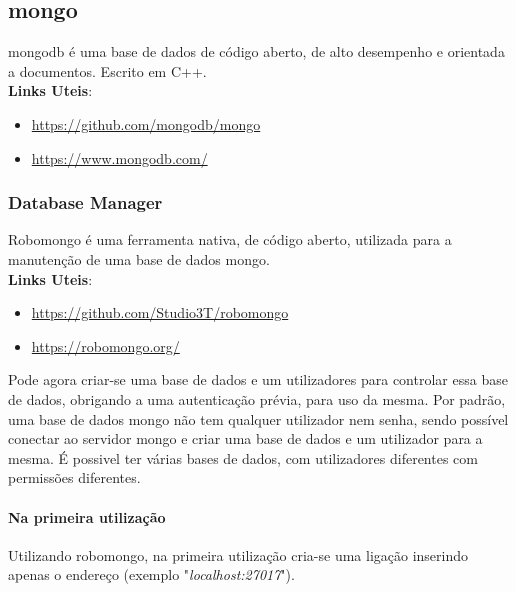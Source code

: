 \subsection{mongo}
mongodb é uma base de dados de código aberto, de alto desempenho e orientada a documentos. Escrito em C++.\newline \\
\textbf{Links Uteis}:
\begin{itemize}
\item \url{https://github.com/mongodb/mongo}
\item \url{https://www.mongodb.com/}
\end{itemize}

\subsubsection{Database Manager}
Robomongo é uma ferramenta nativa, de código aberto, utilizada para a manutenção de uma base de dados mongo.\newline \\
\textbf{Links Uteis}:
\begin{itemize}
\item \url{https://github.com/Studio3T/robomongo}
\item \url{https://robomongo.org/}
\end{itemize}
Pode agora criar-se uma base de dados e um utilizadores para controlar essa base de dados, obrigando a uma autenticação prévia, para uso da mesma.\newline
Por padrão, uma base de dados mongo não tem qualquer utilizador nem senha, sendo possível conectar ao servidor mongo e criar uma base de dados e um utilizador para a mesma. É possivel ter várias bases de dados, com utilizadores diferentes com permissões diferentes.
\paragraph{Na primeira utilização}
Utilizando robomongo, na primeira utilização cria-se uma ligação inserindo apenas o endereço (exemplo "\textit{localhost:27017}").
